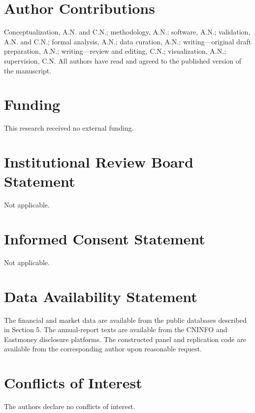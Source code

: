 \documentclass[11pt]{article}
\begin{document}













\section*{Author Contributions}
Conceptualization, A.N. and C.N.; methodology, A.N.; software, A.N.; validation, A.N. and C.N.; formal analysis, A.N.; data curation, A.N.; writing---original draft preparation, A.N.; writing---review and editing, C.N.; visualization, A.N.; supervision, C.N. All authors have read and agreed to the published version of the manuscript.

\section*{Funding}
This research received no external funding.

\section*{Institutional Review Board Statement}
Not applicable.

\section*{Informed Consent Statement}
Not applicable.

\section*{Data Availability Statement}
The financial and market data are available from the public databases described in Section 5. The annual-report texts are available from the CNINFO and Eastmoney disclosure platforms. The constructed panel and replication code are available from the corresponding author upon reasonable request.

\section*{Conflicts of Interest}
The authors declare no conflicts of interest.




\end{document}
